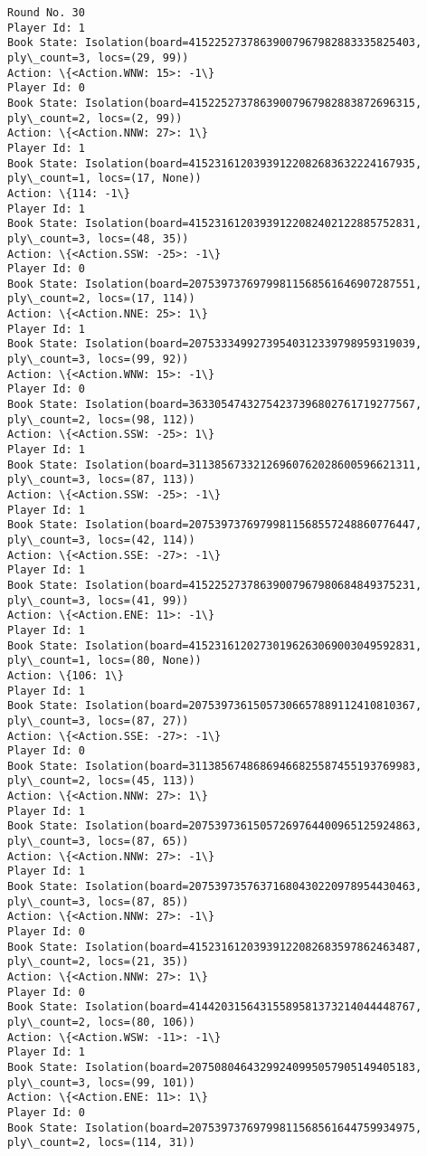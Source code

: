 \documentclass[11pt]{article}
\begin{document}
\begin{Verbatim}[commandchars=\\\{\}]
Round No. 30
Player Id: 1
Book State: Isolation(board=41522527378639007967982883335825403, ply\_count=3, locs=(29, 99))
Action: \{<Action.WNW: 15>: -1\}
Player Id: 0
Book State: Isolation(board=41522527378639007967982883872696315, ply\_count=2, locs=(2, 99))
Action: \{<Action.NNW: 27>: 1\}
Player Id: 1
Book State: Isolation(board=41523161203939122082683632224167935, ply\_count=1, locs=(17, None))
Action: \{114: -1\}
Player Id: 1
Book State: Isolation(board=41523161203939122082402122885752831, ply\_count=3, locs=(48, 35))
Action: \{<Action.SSW: -25>: -1\}
Player Id: 0
Book State: Isolation(board=20753973769799811568561646907287551, ply\_count=2, locs=(17, 114))
Action: \{<Action.NNE: 25>: 1\}
Player Id: 1
Book State: Isolation(board=20753334992739540312339798959319039, ply\_count=3, locs=(99, 92))
Action: \{<Action.WNW: 15>: -1\}
Player Id: 0
Book State: Isolation(board=36330547432754237396802761719277567, ply\_count=2, locs=(98, 112))
Action: \{<Action.SSW: -25>: 1\}
Player Id: 1
Book State: Isolation(board=31138567332126960762028600596621311, ply\_count=3, locs=(87, 113))
Action: \{<Action.SSW: -25>: -1\}
Player Id: 1
Book State: Isolation(board=20753973769799811568557248860776447, ply\_count=3, locs=(42, 114))
Action: \{<Action.SSE: -27>: -1\}
Player Id: 1
Book State: Isolation(board=41522527378639007967980684849375231, ply\_count=3, locs=(41, 99))
Action: \{<Action.ENE: 11>: -1\}
Player Id: 1
Book State: Isolation(board=41523161202730196263069003049592831, ply\_count=1, locs=(80, None))
Action: \{106: 1\}
Player Id: 1
Book State: Isolation(board=20753973615057306657889112410810367, ply\_count=3, locs=(87, 27))
Action: \{<Action.SSE: -27>: -1\}
Player Id: 0
Book State: Isolation(board=31138567486869466825587455193769983, ply\_count=2, locs=(45, 113))
Action: \{<Action.NNW: 27>: 1\}
Player Id: 1
Book State: Isolation(board=20753973615057269764400965125924863, ply\_count=3, locs=(87, 65))
Action: \{<Action.NNW: 27>: -1\}
Player Id: 1
Book State: Isolation(board=20753973576371680430220978954430463, ply\_count=3, locs=(87, 85))
Action: \{<Action.NNW: 27>: -1\}
Player Id: 0
Book State: Isolation(board=41523161203939122082683597862463487, ply\_count=2, locs=(21, 35))
Action: \{<Action.NNW: 27>: 1\}
Player Id: 0
Book State: Isolation(board=41442031564315589581373214044448767, ply\_count=2, locs=(80, 106))
Action: \{<Action.WSW: -11>: -1\}
Player Id: 1
Book State: Isolation(board=20750804643299240995057905149405183, ply\_count=3, locs=(99, 101))
Action: \{<Action.ENE: 11>: 1\}
Player Id: 0
Book State: Isolation(board=20753973769799811568561644759934975, ply\_count=2, locs=(114, 31))

\end{Verbatim}
\end{document}
